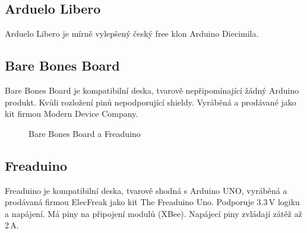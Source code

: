 	\subsection{Arduelo Libero}	
	Arduelo Libero je mírně vylepšený český free klon Arduino Diecimila.
	
	\subsection{Bare Bones Board} 
	Bare Bones Board je kompatibilní deska, tvarově nepřipomínající žádný Arduino produkt. Kvůli rozložení pinů nepodporující shieldy. Vyráběná a prodávané jako kit firmou Modern Device Company.
	
	\begin{figure}[!ht]
    \centering
			\hspace*{5mm}
					\caption{Bare Bones Board a Freaduino}
	\end{figure}	
		
	\subsection{Freaduino} 
	Freaduino je kompatibilní deska, tvarově shodná s Arduino UNO, vyráběná a prodávaná firmou ElecFreak jako kit The Freaduino Uno. Podporuje 3.3\,V logiku a napájení. Má piny na připojení modulů (XBee). Napájecí piny zvládají zátěž až 2\,A.
	
